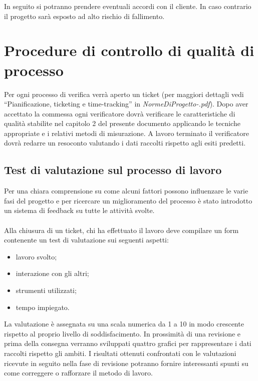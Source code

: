 In seguito si potranno prendere eventuali accordi con il cliente. In caso
contrario il progetto sar\`a esposto ad alto rischio di fallimento.

\section{Procedure di controllo di qualit\`a di processo}
Per ogni processo di verifica verr\`a aperto un ticket (per maggiori dettagli vedi
``Pianificazione, ticketing e time-tracking'' in \emph{NormeDiProgetto-\versionenormeprogetto.pdf}). Dopo aver
accettato la commessa ogni verificatore dovr\`a verificare le caratteristiche di
qualit\`a stabilite nel capitolo 2 del presente documento applicando le tecniche
appropriate e i relativi metodi di misurazione. A lavoro terminato il
verificatore dovr\`a redarre un resoconto valutando i dati raccolti rispetto agli
esiti predetti.

\subsection{Test di valutazione sul processo di lavoro}
Per una chiara comprensione su come alcuni fattori possono influenzare le varie
fasi del progetto e per ricercare un miglioramento del processo \`e
stato introdotto un sistema di feedback su tutte le attivit\`a svolte.\\ \\
Alla chiusura di un ticket, chi ha effettuato il lavoro deve compilare un form
contenente un test di valutazione sui seguenti aspetti:

\begin{itemize}
\item lavoro svolto;
\item interazione con gli altri;
\item strumenti utilizzati;
\item tempo impiegato.
\end{itemize}

La valutazione \`e assegnata su una scala numerica da 1 a 10 in modo crescente
rispetto al proprio livello di soddisfacimento.
In prossimit\`a di una revisione e prima della consegna verranno sviluppati
quattro grafici per rappresentare i dati raccolti rispetto gli ambiti. 
I risultati ottenuti confrontati con le valutazioni ricevute in seguito nella
fase di revisione potranno fornire interessanti spunti su come correggere o
rafforzare il metodo di lavoro.




